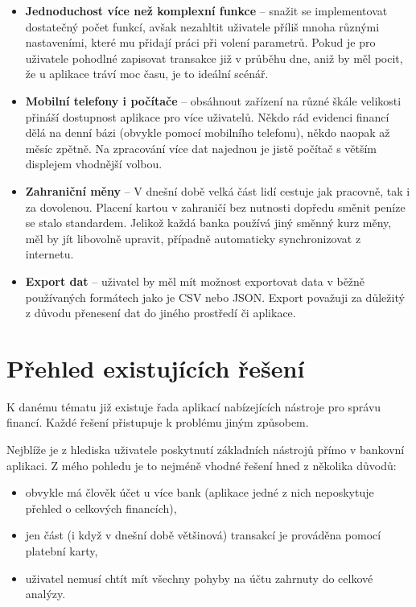 \documentclass[
  biblatex,
  figures=true,
  tables=false,
  glossaries,
  index
]{kidiplom}
\begin{document}
\begin{itemize}
  \item \textbf{Jednoduchost více než komplexní funkce} -- snažit se implementovat dostatečný počet funkcí, avšak nezahltit uživatele příliš mnoha různými nastaveními, které mu přidají práci při volení parametrů. Pokud je pro uživatele pohodlné zapisovat transakce již v průběhu dne, aniž by měl pocit, že u aplikace tráví moc času, je to ideální scénář.
  \item \textbf{Mobilní telefony i počítače} -- obsáhnout zařízení na různé škále velikosti přináší dostupnost aplikace pro více uživatelů. Někdo rád evidenci financí dělá na denní bázi (obvykle pomocí mobilního telefonu), někdo naopak až měsíc zpětně. Na zpracování více dat najednou je jistě počítač s větším displejem vhodnější volbou.
  \item \textbf{Zahraniční měny} -- V dnešní době velká část lidí cestuje jak pracovně, tak i za dovolenou. Placení kartou v zahraničí bez nutnosti dopředu směnit peníze se stalo standardem. Jelikož každá banka používá jiný směnný kurz měny, měl by jít libovolně upravit, případně automaticky synchronizovat z internetu.
  \item \textbf{Export dat} -- uživatel by měl mít možnost exportovat data v běžně používaných formátech jako je CSV nebo JSON. Export považuji za důležitý z důvodu přenesení dat do jiného prostředí či aplikace.
\end{itemize}

\section{Přehled existujících řešení}
K danému tématu již existuje řada aplikací nabízejících nástroje pro správu financí. Každé řešení přistupuje k problému jiným způsobem. 

Nejblíže je z hlediska uživatele poskytnutí základních nástrojů přímo v bankovní aplikaci. Z mého pohledu je to nejméně vhodné řešení hned z několika důvodů:
\begin{itemize}
  \item obvykle má člověk účet u více bank (aplikace jedné z nich neposkytuje přehled o celkových financích),
  \item jen část (i když v dnešní době většinová) transakcí je prováděna pomocí platební karty,
  \item uživatel nemusí chtít mít všechny pohyby na účtu zahrnuty do celkové analýzy.
\end{itemize}
\end{document}
